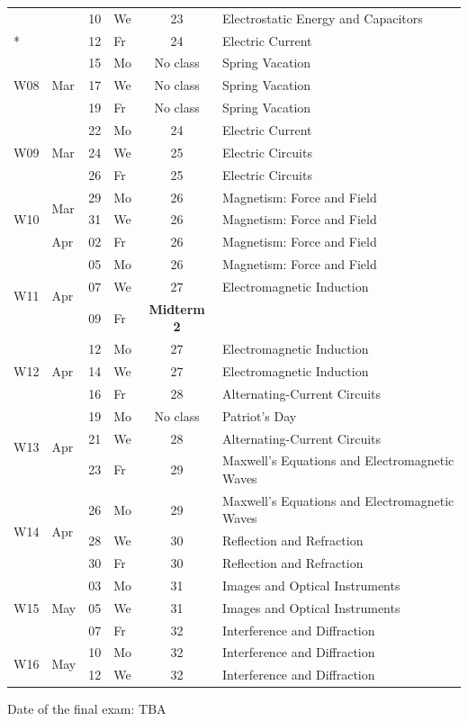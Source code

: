 \documentclass[12pt]{article}
\begin{document}
\begin{longtable}{llllcl}
	&		&	10	&	We	&	23	&	Electrostatic Energy and Capacitors 	\\*	
	&		&	12	&	Fr	&	24	&	Electric Current 	\\	\hline
\multirow{3}{*}{W08}	&	\multirow{3}{*}{Mar}	&	15	&	Mo\rule{0pt}{11pt}	&	No class	&	Spring Vacation	\\*	
	&		&	17	&	We	&	No class	&	Spring Vacation	\\*	
	&		&	19	&	Fr	&	No class	&	Spring Vacation	\\	\hline
\multirow{3}{*}{W09}	&	\multirow{3}{*}{Mar}	&	22	&	Mo\rule{0pt}{11pt}	&	24	&	Electric Current 	\\*	
	&		&	24	&	We	&	25	&	Electric Circuits 	\\*	
	&		&	26	&	Fr	&	25	&	Electric Circuits 	\\	\hline
\multirow{3}{*}{W10}	&	\multirow{2}{*}{Mar}	&	29	&	Mo\rule{0pt}{11pt}	&	26	&	Magnetism: Force and Field	\\*	
	&		&	31	&	We	&	26	&	Magnetism: Force and Field	\\*	
	&	Apr	&	02	&	Fr	&	26	&	Magnetism: Force and Field	\\	\hline
\multirow{3}{*}{W11}	&	\multirow{3}{*}{Apr}	&	05	&	Mo\rule{0pt}{11pt}	&	26	&	Magnetism: Force and Field	\\*	
	&		&	07	&	We	&	27	&	Electromagnetic Induction	\\*	
	&		&	09	&	Fr	&	\textbf{Midterm 2}	&		\\	\hline
\multirow{3}{*}{W12}	&	\multirow{3}{*}{Apr}	&	12	&	Mo\rule{0pt}{11pt}	&	27	&	Electromagnetic Induction	\\*	
	&		&	14	&	We	&	27	&	Electromagnetic Induction	\\*	
	&		&	16	&	Fr	&	28	&	Alternating-Current Circuits	\\	\hline
\multirow{3}{*}{W13}	&	\multirow{3}{*}{Apr}	&	19	&	Mo\rule{0pt}{11pt}	&	No class	&	Patriot’s Day	\\*	
	&		&	21	&	We	&	28	&	Alternating-Current Circuits	\\*	
	&		&	23	&	Fr	&	29	&	Maxwell’s Equations and Electromagnetic Waves	\\	\hline
\multirow{3}{*}{W14}	&	\multirow{3}{*}{Apr}	&	26	&	Mo\rule{0pt}{11pt}	&	29	&	Maxwell’s Equations and Electromagnetic Waves	\\*	
	&		&	28	&	We	&	30	&	Reflection and Refraction	\\*	
	&		&	30	&	Fr	&	30	&	Reflection and Refraction	\\	\hline
\multirow{3}{*}{W15}	&	\multirow{3}{*}{May}	&	03	&	Mo\rule{0pt}{11pt}	&	31	&	Images and Optical Instruments	\\*	
	&		&	05	&	We	&	31	&	Images and Optical Instruments	\\*	
	&		&	07	&	Fr	&	32	&	 Interference and Diffraction	\\	\hline
\multirow{2}{*}{W16}	&	\multirow{2}{*}{May}	&	10	&	Mo\rule{0pt}{11pt}	&	32	&	 Interference and Diffraction	\\*	
	&		&	12	&	We	&	32	&	 Interference and Diffraction	\\	\hline
\end{longtable}
\endgroup
\medskip

\noindent Date of the final exam: TBA
\end{document}

